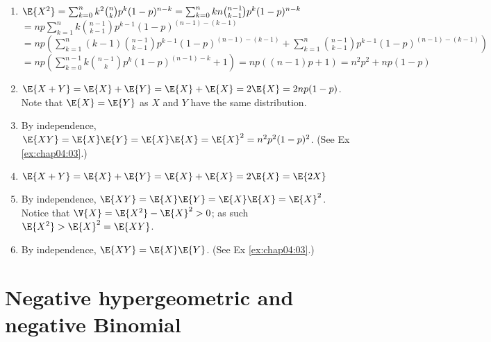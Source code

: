 \begin{exercise}
\begin{solution}
\begin{enumerate}
		\item $\E{X^2} = \sum_{k = 0}^n k^2 \binom{n}{k} p^k (1 - p)^{n - k} = \sum_{k = 0}^n kn \binom{n - 1}{k - 1} p^k (1 - p)^{n - k}$\\$ = np \sum_{k = 1}^n k \binom{n - 1}{k - 1} p^{k - 1} (1 - p)^{(n - 1) - (k - 1)}$\\$ = np \left(\sum_{k = 1}^n (k - 1) \binom{n - 1}{k - 1} p^{k - 1} (1 - p)^{(n - 1) - (k - 1)} + \sum_{k = 1}^n \binom{n - 1}{k - 1} p^{k - 1} (1 - p)^{(n - 1) - (k - 1)}\right)$\\$ = np \left(\sum_{k = 0}^{n - 1} k \binom{n - 1}{k} p^{k} (1 - p)^{(n - 1) - k} + 1\right) = np((n - 1)p + 1) = n^2 p^2 + np(1 - p)$
		\item $\E{X + Y} = \E{X} + \E{Y} = \E{X} + \E{X} = 2\E{X} = 2np(1-p)$. Note that $\E{X} = \E{Y}$ as $X$ and $Y$ have the same distribution.
		\item By independence, $\E{XY} = \E{X}\E{Y} = \E{X}\E{X} = \E{X}^2 = n^2p^2(1 - p)^2$. (See Ex \ref{ex:chap04:03}.)
		\item $\E{X+Y} = \E{X} + \E{Y} = \E{X} + \E{X} = 2\E{X} = \E{2X}$
		\item By independence, $\E{XY} = \E{X}\E{Y} = \E{X}\E{X} = \E{X}^2$. Notice that $\V{X} = \E{X^2} - \E{X}^2 > 0$; as such $\E{X^2} > \E{X}^2 = \E{XY}$.
		\item By independence, $\E{XY} = \E{X}\E{Y}$. (See Ex \ref{ex:chap04:03}.)
	\end{enumerate}
	\end{solution}
\end{exercise}

\section{Negative hypergeometric and negative Binomial}
\label{sec:section-4.2}

